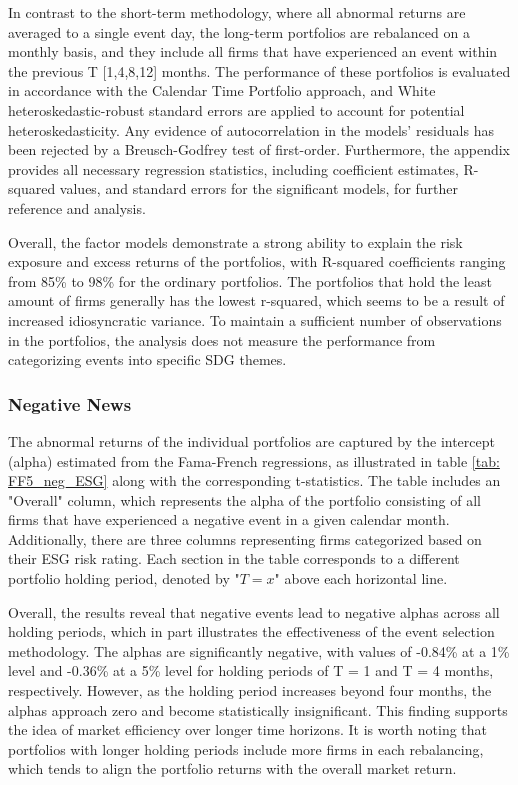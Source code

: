 In contrast to the short-term methodology, where all abnormal returns are averaged to a single event day, the long-term portfolios are rebalanced on a monthly basis, and they include all firms that have experienced an event within the previous T [1,4,8,12] months. The performance of these portfolios is evaluated in accordance with the Calendar Time Portfolio approach, and White heteroskedastic-robust standard errors are applied to account for potential heteroskedasticity. Any evidence of autocorrelation in the models' residuals has been rejected by a Breusch-Godfrey test of first-order. Furthermore, the appendix provides all necessary regression statistics, including coefficient estimates, R-squared values, and standard errors for the significant models, for further reference and analysis.

Overall, the factor models demonstrate a strong ability to explain the risk exposure and excess returns of the portfolios, with R-squared coefficients ranging from 85\% to 98\% for the ordinary portfolios. The portfolios that hold the least amount of firms generally has the lowest r-squared, which seems to be a result of increased idiosyncratic variance. To maintain a sufficient number of observations in the portfolios, the analysis does not measure the performance from categorizing events into specific SDG themes. 

\subsubsection{Negative News}

The abnormal returns of the individual portfolios are captured by the intercept (alpha) estimated from the Fama-French regressions, as illustrated in table \ref{tab: FF5_neg_ESG} along with the corresponding t-statistics. The table includes an "Overall" column, which represents the alpha of the portfolio consisting of all firms that have experienced a negative event in a given calendar month. Additionally, there are three columns representing firms categorized based on their ESG risk rating. Each section in the table corresponds to a different portfolio holding period, denoted by "$T = x$" above each horizontal line.

Overall, the results reveal that negative events lead to negative alphas across all holding periods, which in part illustrates the effectiveness of the event selection methodology. The alphas are significantly negative, with values of -0.84\% at a 1\% level and -0.36\% at a 5\% level for holding periods of T = 1 and T = 4 months, respectively. However, as the holding period increases beyond four months, the alphas approach zero and become statistically insignificant. This finding supports the idea of market efficiency over longer time horizons. It is worth noting that portfolios with longer holding periods include more firms in each rebalancing, which tends to align the portfolio returns with the overall market return. 

